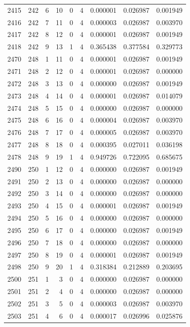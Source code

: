 \begin{longtable}{rrrrrrrrr}
2415 & 242 & 6 & 10 & 0 & 4 & 0.000001 & 0.026987 & 0.001949 \\
2416 & 242 & 7 & 11 & 0 & 4 & 0.000003 & 0.026987 & 0.003970 \\
2417 & 242 & 8 & 12 & 0 & 4 & 0.000001 & 0.026987 & 0.001949 \\
2418 & 242 & 9 & 13 & 1 & 4 & 0.365438 & 0.377584 & 0.329773 \\
2470 & 248 & 1 & 11 & 0 & 4 & 0.000001 & 0.026987 & 0.001949 \\
2471 & 248 & 2 & 12 & 0 & 4 & 0.000001 & 0.026987 & 0.000000 \\
2472 & 248 & 3 & 13 & 0 & 4 & 0.000000 & 0.026987 & 0.001949 \\
2473 & 248 & 4 & 14 & 0 & 4 & 0.000001 & 0.026987 & 0.014079 \\
2474 & 248 & 5 & 15 & 0 & 4 & 0.000000 & 0.026987 & 0.000000 \\
2475 & 248 & 6 & 16 & 0 & 4 & 0.000004 & 0.026987 & 0.003970 \\
2476 & 248 & 7 & 17 & 0 & 4 & 0.000005 & 0.026987 & 0.003970 \\
2477 & 248 & 8 & 18 & 0 & 4 & 0.000395 & 0.027011 & 0.036198 \\
2478 & 248 & 9 & 19 & 1 & 4 & 0.949726 & 0.722095 & 0.685675 \\
2490 & 250 & 1 & 12 & 0 & 4 & 0.000000 & 0.026987 & 0.001949 \\
2491 & 250 & 2 & 13 & 0 & 4 & 0.000000 & 0.026987 & 0.000000 \\
2492 & 250 & 3 & 14 & 0 & 4 & 0.000000 & 0.026987 & 0.000000 \\
2493 & 250 & 4 & 15 & 0 & 4 & 0.000001 & 0.026987 & 0.001949 \\
2494 & 250 & 5 & 16 & 0 & 4 & 0.000000 & 0.026987 & 0.000000 \\
2495 & 250 & 6 & 17 & 0 & 4 & 0.000000 & 0.026987 & 0.001949 \\
2496 & 250 & 7 & 18 & 0 & 4 & 0.000000 & 0.026987 & 0.000000 \\
2497 & 250 & 8 & 19 & 0 & 4 & 0.000001 & 0.026987 & 0.001949 \\
2498 & 250 & 9 & 20 & 1 & 4 & 0.318384 & 0.212889 & 0.203695 \\
2500 & 251 & 1 & 3 & 0 & 4 & 0.000000 & 0.026987 & 0.000000 \\
2501 & 251 & 2 & 4 & 0 & 4 & 0.000000 & 0.026987 & 0.000000 \\
2502 & 251 & 3 & 5 & 0 & 4 & 0.000003 & 0.026987 & 0.003970 \\
2503 & 251 & 4 & 6 & 0 & 4 & 0.000017 & 0.026996 & 0.025876 \\

\end{longtable}
